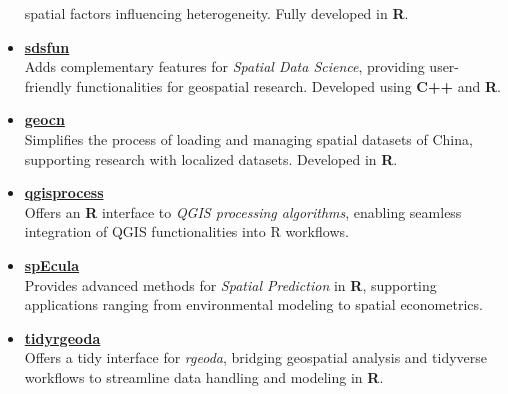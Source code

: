 \documentclass[11pt,a4paper,]{moderncv}
\begin{document}
\begin{itemize}
  spatial factors influencing heterogeneity. Fully developed in
  \textbf{R}.
\item
  \textbf{\href{https://github.com/stscl/sdsfun}{sdsfun}}\\
  Adds complementary features for \emph{Spatial Data Science}, providing
  user-friendly functionalities for geospatial research. Developed using
  \textbf{C++} and \textbf{R}.
\item
  \textbf{\href{https://github.com/stscl/geocn}{geocn}}\\
  Simplifies the process of loading and managing spatial datasets of
  China, supporting research with localized datasets. Developed in
  \textbf{R}.
\item
  \textbf{\href{https://github.com/r-spatial/qgisprocess}{qgisprocess}}\\
  Offers an \textbf{R} interface to \emph{QGIS processing algorithms},
  enabling seamless integration of QGIS functionalities into R
  workflows.
\item
  \textbf{\href{https://github.com/SpatLyu/spEcula}{spEcula}}\\
  Provides advanced methods for \emph{Spatial Prediction} in \textbf{R},
  supporting applications ranging from environmental modeling to spatial
  econometrics.
\item
  \textbf{\href{https://github.com/SpatLyu/tidyrgeoda}{tidyrgeoda}}\\
  Offers a tidy interface for \emph{rgeoda}, bridging geospatial
  analysis and tidyverse workflows to streamline data handling and
  modeling in \textbf{R}.
\end{itemize}
\end{document}
